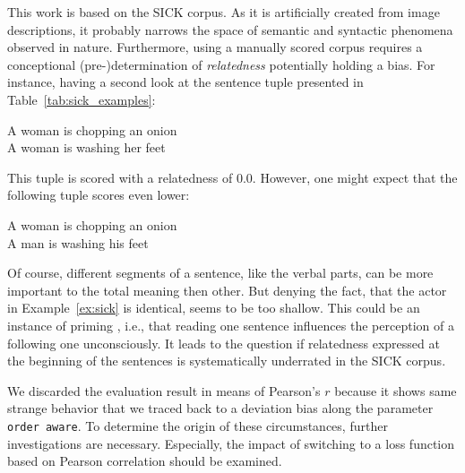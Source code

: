 This work is based on the SICK corpus. As it is artificially created from image descriptions, it probably narrows the space of semantic and syntactic phenomena observed in nature. Furthermore, using a manually scored corpus requires a conceptional (pre-)determination of \textit{relatedness} potentially holding a bias. For instance, having a second look at the sentence tuple presented in Table~\ref{tab:sick_examples}:
\begin{exe}
	\ex \label{ex:sick} A woman is chopping an onion \\
		A woman is washing her feet
\end{exe}
This tuple is scored with a relatedness of $0.0$. However, one might expect that the following tuple scores even lower:
\begin{exe}
	\ex \label{ex:no_sick} A woman is chopping an onion \\
		A man is washing his feet
\end{exe}
Of course, different segments of a sentence, like the verbal parts, can be more important to the total meaning then other. But denying the fact, that the actor in Example~\ref{ex:sick} is identical,  seems to be too shallow. This could be an instance of priming \autocite{weingarten_primed_2016}, i.e., that reading one sentence influences the perception of a following one unconsciously. It leads to the question if relatedness expressed at the beginning of the sentences is systematically underrated in the SICK corpus.

We discarded the evaluation result in means of Pearson's $r$ because it shows same strange behavior that we traced back to a deviation bias along the parameter \texttt{order aware}. To determine the origin of these circumstances, further investigations are necessary. Especially, the impact of switching to a loss function based on Pearson correlation should be examined.


